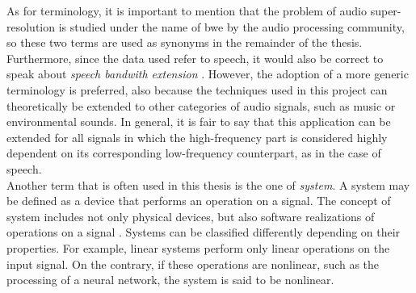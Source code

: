 As for terminology, it is important to mention that the problem of audio super-resolution is studied under the name of \gls{bwe} \cite{ekstrand2002bandwidth} by the audio processing community, so these two terms are used as synonyms in the remainder of the thesis. Furthermore, since the data used refer to speech, it would also be correct to speak about \textit{speech bandwith extension} \cite{wang2018speech}. However, the adoption of a more generic terminology is preferred, also because the techniques used in this project can theoretically be extended to other categories of audio signals, such as music or environmental sounds. In general, it is fair to say that this application can be extended for all signals in which the high-frequency part is considered highly dependent on its corresponding low-frequency counterpart, as in the case of speech. \\
Another term that is often used in this thesis is the one of \textit{system}.
A system may be defined as a device that performs an operation on a signal. The concept of system includes not only physical devices, but also software realizations of operations on a signal \cite{proakis2006dimitris}. Systems can be classified differently depending on their properties. For example, linear systems perform only linear operations on the input signal. On the contrary, if these operations are nonlinear, such as the processing of a neural network, the system is said to be nonlinear.
\newpage 
